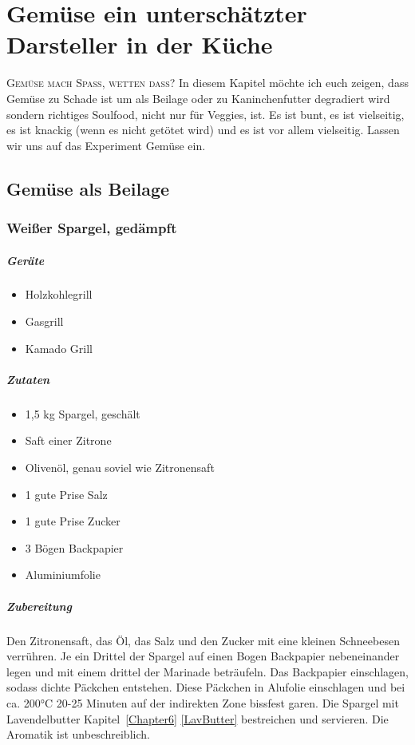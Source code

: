 \chapter{Gemüse ein unterschätzter Darsteller in der Küche}\label{Chapter3}

\lettrine[lines=3]{G}{emüse mach Spass, wetten dass?} In diesem Kapitel möchte ich euch zeigen, dass Gemüse zu Schade ist um als Beilage oder zu Kaninchenfutter degradiert wird sondern richtiges Soulfood, nicht nur für Veggies, ist. Es ist bunt, es ist vielseitig, es ist knackig (wenn es nicht getötet wird) und es ist vor allem vielseitig. Lassen wir uns auf das Experiment Gemüse ein.

\section{Gemüse als Beilage}

\subsection{Weißer Spargel, gedämpft}

\paragraph{Geräte}

\begin{itemize}[noitemsep]
	\item Holzkohlegrill
	\item Gasgrill
	\item Kamado Grill
\end{itemize}

\paragraph{Zutaten}

\begin{itemize}[noitemsep]
	\item 1,5 kg Spargel, geschält
	\item Saft einer Zitrone
	\item Olivenöl, genau soviel wie Zitronensaft
	\item 1 gute Prise Salz
	\item 1 gute Prise Zucker
	\item 3 Bögen Backpapier
	\item Aluminiumfolie
\end{itemize}
	
\paragraph{Zubereitung}
Den Zitronensaft, das Öl, das Salz und den Zucker mit eine kleinen Schneebesen verrühren. Je ein Drittel der Spargel auf einen Bogen Backpapier nebeneinander legen und mit einem drittel der Marinade beträufeln. Das Backpapier einschlagen, sodass dichte Päckchen entstehen. Diese Päckchen in Alufolie einschlagen und bei ca. 200°C 20-25 Minuten auf der indirekten Zone bissfest garen. Die Spargel mit Lavendelbutter Kapitel~\ref{Chapter6} \vref{LavButter} bestreichen und servieren. Die Aromatik ist unbeschreiblich.

